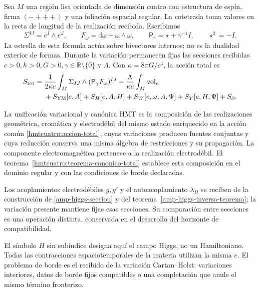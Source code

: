 Sea \(M\) una región lisa orientada de dimensión cuatro con estructura
de espín, firma \((-+++)\) y una foliación espacial regular. La cotetrada
toma valores en la recta de longitud de la realización recibida.
Escribimos
\[
 \Sigma^{IJ}=e^I\wedge e^J,\qquad
 F_\omega=\mathrm d\omega+\omega\wedge\omega,\qquad
 \mathsf P_\gamma=\star+\gamma^{-1}I,\qquad \star^2=-I.
\]
La estrella de esta fórmula actúa sobre bivectores internos; no es la
dualidad exterior de formas. Durante la variación permanecen fijas las
secciones recibidas \(c>0,\hbar>0,G>0,\gamma\in\mathbb R\setminus\{0\}\)
y \(\Lambda\). Con \(\kappa=8\pi G/c^4\), la acción total es
\begin{equation}
 \begin{split}
 S_{\rm tot}={}&\frac1{2\kappa c}
   \int_M\Sigma_{IJ}\wedge(\mathsf P_\gamma F_\omega)^{IJ}
 -\frac{\Lambda}{\kappa c}\int_M\operatorname{vol}_e\\
 &+S_{\rm YM}[e,A]+S_H[e,A,H]
   +S_W[e,\omega,A,\Psi]+S_Y[e,H,\Psi]+S_{\partial}.
 \end{split}
 \label{hmtcuatro:accion-total}
\end{equation}

\begin{definition}
\label{hmtcuatro:def-unificacion}
La unificación variacional y canónica HMT es la composición de las realizaciones geométrica, cromática y electrodébil del mismo estado enriquecido en la acción común \eqref{hmtcuatro:accion-total}, cuyas variaciones producen fuentes conjuntas y cuya reducción conserva una misma álgebra de restricciones y su propagación. La componente electromagnética pertenece a la realización electrodébil. El teorema~\ref{hmtcuatro:teorema-canonico-total} establece esta composición en el dominio regular y con las condiciones de borde declaradas.
\end{definition}
Los acoplamientos electrodébiles $g,g'$ y el autoacoplamiento $\lambda_H$ se reciben de la construcción de \ref{amp-higgs-seccion} y del teorema~\ref{amp-higgs-inversa-teorema}; la variación presente mantiene fijas esas secciones. Su comparación entre secciones es una operación distinta, conservada en el desarrollo del horizonte de compatibilidad.


El símbolo \(H\) sin subíndice designa aquí el campo Higgs, no un
Hamiltoniano. Todas las contracciones espaciotemporales de la materia
utilizan la misma \(e\). El problema de borde es el recibido de la
variación Cartan--Holst: variaciones interiores, datos de borde fijos
compatibles o una completación que anule el mismo término fronterizo.

